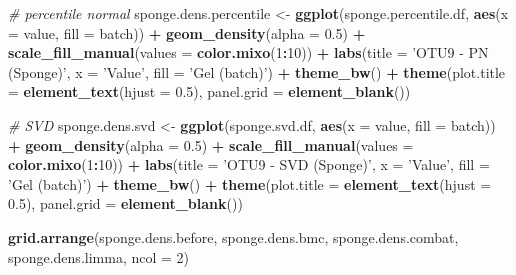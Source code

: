 \documentclass[]{book}
\newenvironment{Shaded}{\begin{snugshade}}{\end{snugshade}}
\newcommand{\KeywordTok}[1]{\textcolor[rgb]{0.13,0.29,0.53}{\textbf{#1}}}
\newcommand{\DataTypeTok}[1]{\textcolor[rgb]{0.13,0.29,0.53}{#1}}
\newcommand{\DecValTok}[1]{\textcolor[rgb]{0.00,0.00,0.81}{#1}}
\newcommand{\FloatTok}[1]{\textcolor[rgb]{0.00,0.00,0.81}{#1}}
\newcommand{\StringTok}[1]{\textcolor[rgb]{0.31,0.60,0.02}{#1}}
\newcommand{\CommentTok}[1]{\textcolor[rgb]{0.56,0.35,0.01}{\textit{#1}}}
\newcommand{\OperatorTok}[1]{\textcolor[rgb]{0.81,0.36,0.00}{\textbf{#1}}}
\newcommand{\NormalTok}[1]{#1}
\begin{document}
\begin{Shaded}
\begin{Highlighting}[]
\CommentTok{# percentile normal}
\NormalTok{sponge.dens.percentile <-}\StringTok{ }\KeywordTok{ggplot}\NormalTok{(sponge.percentile.df, }\KeywordTok{aes}\NormalTok{(}\DataTypeTok{x =}\NormalTok{ value, }\DataTypeTok{fill =}\NormalTok{ batch)) }\OperatorTok{+}\StringTok{ }
\StringTok{  }\KeywordTok{geom_density}\NormalTok{(}\DataTypeTok{alpha =} \FloatTok{0.5}\NormalTok{) }\OperatorTok{+}\StringTok{ }\KeywordTok{scale_fill_manual}\NormalTok{(}\DataTypeTok{values =} \KeywordTok{color.mixo}\NormalTok{(}\DecValTok{1}\OperatorTok{:}\DecValTok{10}\NormalTok{)) }\OperatorTok{+}\StringTok{ }
\StringTok{  }\KeywordTok{labs}\NormalTok{(}\DataTypeTok{title =} \StringTok{'OTU9 - PN (Sponge)'}\NormalTok{, }\DataTypeTok{x =} \StringTok{'Value'}\NormalTok{, }\DataTypeTok{fill =} \StringTok{'Gel (batch)'}\NormalTok{) }\OperatorTok{+}\StringTok{ }
\StringTok{  }\KeywordTok{theme_bw}\NormalTok{() }\OperatorTok{+}\StringTok{ }\KeywordTok{theme}\NormalTok{(}\DataTypeTok{plot.title =} \KeywordTok{element_text}\NormalTok{(}\DataTypeTok{hjust =} \FloatTok{0.5}\NormalTok{), }
                     \DataTypeTok{panel.grid =} \KeywordTok{element_blank}\NormalTok{())}


\CommentTok{# SVD}
\NormalTok{sponge.dens.svd <-}\StringTok{ }\KeywordTok{ggplot}\NormalTok{(sponge.svd.df, }\KeywordTok{aes}\NormalTok{(}\DataTypeTok{x =}\NormalTok{ value, }\DataTypeTok{fill =}\NormalTok{ batch)) }\OperatorTok{+}\StringTok{ }
\StringTok{  }\KeywordTok{geom_density}\NormalTok{(}\DataTypeTok{alpha =} \FloatTok{0.5}\NormalTok{) }\OperatorTok{+}\StringTok{ }\KeywordTok{scale_fill_manual}\NormalTok{(}\DataTypeTok{values =} \KeywordTok{color.mixo}\NormalTok{(}\DecValTok{1}\OperatorTok{:}\DecValTok{10}\NormalTok{)) }\OperatorTok{+}\StringTok{ }
\StringTok{  }\KeywordTok{labs}\NormalTok{(}\DataTypeTok{title =} \StringTok{'OTU9 - SVD (Sponge)'}\NormalTok{, }\DataTypeTok{x =} \StringTok{'Value'}\NormalTok{, }\DataTypeTok{fill =} \StringTok{'Gel (batch)'}\NormalTok{) }\OperatorTok{+}\StringTok{ }
\StringTok{  }\KeywordTok{theme_bw}\NormalTok{() }\OperatorTok{+}\StringTok{ }\KeywordTok{theme}\NormalTok{(}\DataTypeTok{plot.title =} \KeywordTok{element_text}\NormalTok{(}\DataTypeTok{hjust =} \FloatTok{0.5}\NormalTok{), }
                     \DataTypeTok{panel.grid =} \KeywordTok{element_blank}\NormalTok{())}
\end{Highlighting}
\end{Shaded}

\begin{Shaded}
\begin{Highlighting}[]
\KeywordTok{grid.arrange}\NormalTok{(sponge.dens.before, sponge.dens.bmc, }
\NormalTok{             sponge.dens.combat, sponge.dens.limma, }\DataTypeTok{ncol =} \DecValTok{2}\NormalTok{)}
\end{Highlighting}
\end{Shaded}
\end{document}
